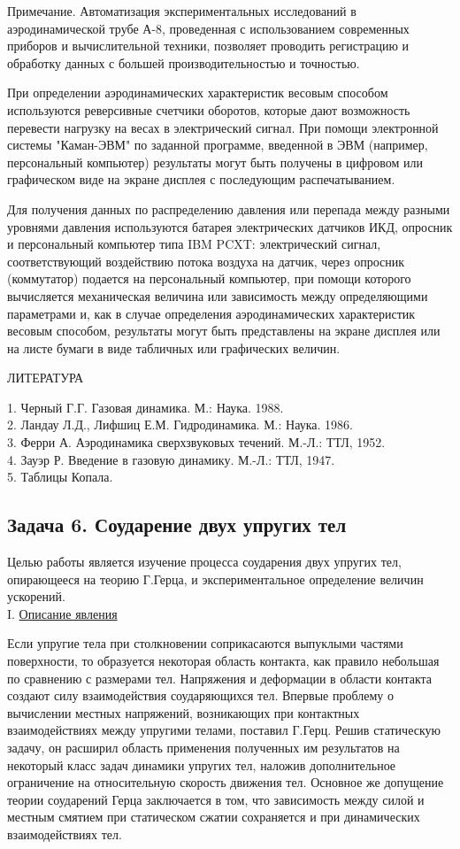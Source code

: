 \documentclass[specialist, subf, href, colorlinks=true, 14pt, final]{disser}
\theoremstyle{definition}
\newcommand{\anonsubsection}[1]{\subsection*{#1}\addcontentsline{toc}{subsection}{#1}}
\newcommand{\npart}[2]{\noindent #1. \underline{#2}}
\begin{document}
Примечание. Автоматизация экспериментальных исследований в аэродинамической трубе А-8, проведенная с использованием современных приборов и вычислительной техники, позволяет проводить регистрацию и обработку данных с большей производительностью и точностью.

При определении аэродинамических характеристик весовым способом используются реверсивные счетчики оборотов, которые дают возможность перевести нагрузку на весах в электрический сигнал. При помощи электронной системы "Каман-ЭВМ"{} по заданной программе, введенной в ЭВМ (например, персональный компьютер) результаты могут быть получены в цифровом или графическом виде на экране дисплея с последующим распечатыванием.

Для получения данных по распределению давления или перепада между разными уровнями давления используются батарея электрических датчиков ИКД, опросник и персональный компьютер типа IBM PCXT: электрический сигнал, соответствующий воздействию потока воздуха на датчик, через опросник (коммутатор) подается на персональный компьютер, при помощи которого вычисляется механическая величина или зависимость между определяющими параметрами и, как в случае определения аэродинамических характеристик весовым способом, результаты могут быть представлены на экране дисплея или на листе бумаги в виде табличных или графических величин.\\

\begin{center}
ЛИТЕРАТУРА
\end{center}
1. Черный Г.Г. Газовая динамика. М.: Наука. 1988.\\
2. Ландау Л.Д., Лифшиц Е.М. Гидродинамика. М.: Наука. 1986.\\
3. Ферри А. Аэродинамика сверхзвуковых течений. М.-Л.: ТТЛ, 1952.\\
4. Зауэр Р. Введение в газовую динамику. М.-Л.: ТТЛ, 1947.\\
5. Таблицы Копала.

\newpage
\anonsubsection{Задача 6. Соударение двух упругих тел}

Целью работы является изучение процесса соударения двух упругих тел, опирающееся на теорию Г.Герца, и экспериментальное определение величин ускорений.\\

\npart{I}{Описание явления}

Если упругие тела при столкновении соприкасаются выпуклыми частями поверхности, то образуется некоторая область контакта, как правило небольшая по сравнению с размерами тел. Напряжения и деформации в области контакта создают силу взаимодействия соударяющихся тел. Впервые проблему о вычислении местных напряжений, возникающих при контактных взаимодействиях между упругими телами, поставил Г.Герц. Решив статическую задачу, он расширил область применения полученных им результатов на некоторый класс задач динамики упругих тел, наложив дополнительное ограничение на относительную скорость движения тел. Основное же допущение теории соударений Герца заключается в том, что  зависимость между силой и местным смятием при статическом сжатии сохраняется и при динамических взаимодействиях тел. 
\end{document}
